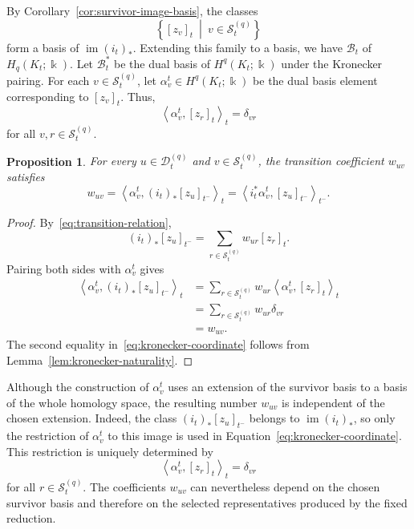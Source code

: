 \documentclass[11pt]{article}
\theoremstyle{paperdefinition}
\theoremstyle{paperplain}
\newtheorem{proposition}[definition]{Proposition}
\theoremstyle{paperremark}
\begin{document}
By Corollary~\ref{cor:survivor-image-basis}, the classes
\[
\left\{[z_v]_t \ \middle|\ v\in\mathcal S_t^{(q)} \right\}
\]
form a basis of $\operatorname{im}(i_t)_*$. Extending this family to a basis, we have $\mathcal B_t$ of $H_q(K_t;\Bbbk)$. Let $\mathcal B_t^*$ be the dual basis of $H^q(K_t;\Bbbk)$ under the Kronecker pairing. For each $v\in\mathcal S_t^{(q)}$, let $\alpha_v^t\in H^q(K_t;\Bbbk)$ be the dual basis element corresponding to $[z_v]_t$. Thus,
\[
\left\langle\alpha_v^t, [z_r]_t \right\rangle_t = \delta_{vr}
\]
for all $v,r\in\mathcal S_t^{(q)}$.

\begin{proposition}
\label{prop:kronecker-coordinate-formula}
For every $u\in\mathcal D_t^{(q)}$ and $v\in\mathcal S_t^{(q)}$, the transition coefficient $w_{uv}$ satisfies
\begin{equation}
\label{eq:kronecker-coordinate}
w_{uv} = \left\langle\alpha_v^t, (i_t)_*[z_u]_{t^-}\right\rangle_t = \left\langle i_t^*\alpha_v^t, [z_u]_{t^-} \right\rangle_{t^-}.
\end{equation}
\end{proposition}

\begin{proof}
By~\eqref{eq:transition-relation},
\[
(i_t)_*[z_u]_{t^-} = \sum_{r\in\mathcal S_t^{(q)}}w_{ur}[z_r]_t.
\]
Pairing both sides with $\alpha_v^t$ gives
\[
\begin{aligned}
\left\langle \alpha_v^t, (i_t)_*[z_u]_{t^-} \right\rangle_t &= \sum_{r\in\mathcal S_t^{(q)}} w_{ur} \left\langle \alpha_v^t, [z_r]_t \right\rangle_t\\
&= \sum_{r\in\mathcal S_t^{(q)}} w_{ur}\delta_{vr}\\
&= w_{uv}.
\end{aligned}
\]
The second equality in~\eqref{eq:kronecker-coordinate} follows from Lemma~\ref{lem:kronecker-naturality}.
\end{proof}

Although the construction of $\alpha_v^t$ uses an extension of the survivor basis to a basis of the whole homology space, the resulting number $w_{uv}$ is independent of the chosen extension. Indeed, the class $(i_t)_*[z_u]_{t^-}$ belongs to $\operatorname{im}(i_t)_*$, so only the restriction of $\alpha_v^t$ to this image is used in Equation~\eqref{eq:kronecker-coordinate}. This restriction is uniquely determined by
\[
\left\langle\alpha_v^t,[z_r]_t\right\rangle_t = \delta_{vr}
\]
for all $r\in\mathcal S_t^{(q)}$. The coefficients $w_{uv}$ can nevertheless depend on the chosen survivor basis and therefore on the selected representatives produced by the fixed reduction.
\end{document}
